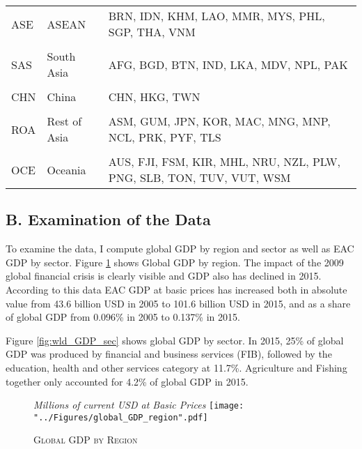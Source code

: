 \documentclass[a4paper]{article}
\begin{document}
\begin{table}[h!]
{\begin{tabular}{llp{6cm}}
ASE & ASEAN & BRN, IDN, KHM, LAO, MMR, MYS, PHL, SGP, THA, VNM \\ \\
SAS & South Asia & AFG, BGD, BTN, IND, LKA, MDV, NPL, PAK \\ \\
CHN & China & CHN, HKG, TWN \\ \\
ROA & Rest of Asia & ASM, GUM, JPN, KOR, MAC, MNG, MNP, NCL, PRK, PYF, TLS \\ \\
OCE & Oceania & AUS, FJI, FSM, KIR, MHL, NRU, NZL, PLW, PNG, SLB, TON, TUV, VUT, WSM
 \\ \bottomrule
\end{tabular}
}
\end{table}
\FloatBarrier

\subsection*{B. Examination of the Data}
\setcounter{table}{0}
\renewcommand{\thetable}{B\arabic{table}}
\setcounter{figure}{0}
\renewcommand{\thefigure}{B\arabic{figure}}

To examine the data, I compute global GDP by region and sector as well as EAC GDP by sector. Figure \ref{fig:wld_GDP_reg} shows Global GDP by region. The impact of the 2009 global financial crisis is clearly visible and GDP also has declined in 2015. %
According to this data EAC GDP at basic prices has increased both in absolute value from 43.6 billion USD in 2005 to 101.6 billion USD in 2015, and as a share of global GDP from 0.096\% in 2005 to 0.137\% in 2015. \newline

Figure \ref{fig:wld_GDP_sec} shows global GDP by sector. In 2015, 25\% of global GDP was produced by financial and business services (FIB), followed by the education, health and other services category at 11.7\%. Agriculture and Fishing together only accounted for 4.2\% of global GDP in 2015.




\begin{figure}[h!]
\centering
\caption{\label{fig:wld_GDP_reg}\textsc{Global GDP by Region}}
\small{\textit{Millions of current USD at Basic Prices}}
\texttt{[image: "../Figures/global\_GDP\_region".pdf]} %
\end{figure}
\FloatBarrier
\end{document}
